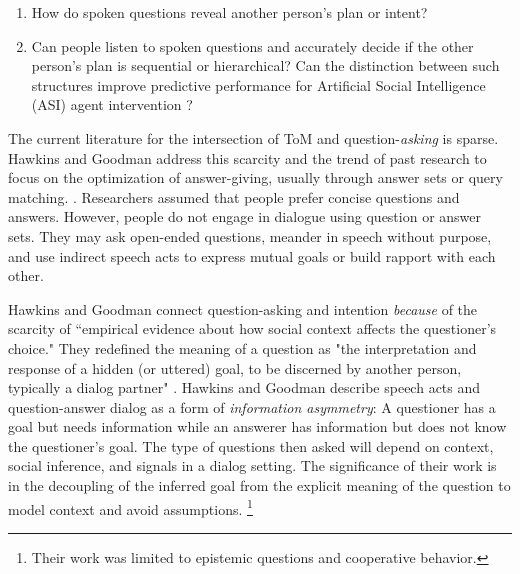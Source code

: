 \begin{enumerate}
    \item How do spoken questions reveal another person's plan or intent? 
    \item Can people listen to spoken questions and accurately decide if the
        other person's plan is sequential or hierarchical? Can the
        distinction between such structures improve predictive performance for
        Artificial Social Intelligence (ASI) agent intervention ?
\end{enumerate}


The current literature for the intersection of ToM and question-\emph{asking} is sparse. Hawkins and Goodman address this scarcity and the trend of past research to focus on the optimization of answer-giving, usually through answer sets or query matching. \citep{hawkins_goodman_2017}.   Researchers assumed that people
prefer concise questions and answers. However, people do not engage in dialogue
using question or answer sets. They may ask open-ended questions, meander in
speech without purpose, and use indirect speech acts to express mutual goals or
build rapport with each other. 


Hawkins and Goodman connect question-asking and intention \emph{because} of the
scarcity of “empirical evidence about how social context affects the
questioner’s choice." They redefined the meaning of a question as "the
interpretation and response of a hidden (or uttered) goal, to be discerned by
another person, typically a dialog partner" \citep{hawkins_goodman_2017}.
Hawkins and Goodman describe speech acts and question-answer dialog as a form
of \emph{information asymmetry}: A questioner has a goal but needs information
while an answerer has information but does not know the questioner’s goal. The
type of questions then asked will depend on context, social inference, and
signals in a dialog setting. The significance of their work is in the
decoupling of the inferred goal from the explicit meaning of the question to
model context and avoid assumptions. \footnote{Their work was limited to
epistemic questions and cooperative behavior.}

